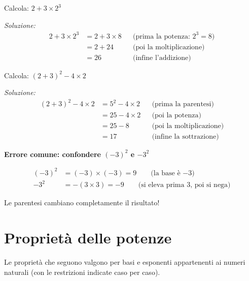 \begin{esempio}
  Calcola: $2 + 3 \times 2^3$

  \textit{Soluzione:}
  \begin{align*}
    2 + 3 \times 2^3
     & = 2 + 3 \times 8 &  & \text{(prima la potenza: } 2^3 = 8\text{)} \\
     & = 2 + 24         &  & \text{(poi la moltiplicazione)}            \\
     & = 26             &  & \text{(infine l'addizione)}
  \end{align*}
\end{esempio}

\begin{esempio}
  Calcola: $(2 + 3)^2 - 4 \times 2$

  \textit{Soluzione:}
  \begin{align*}
    (2 + 3)^2 - 4 \times 2
     & = 5^2 - 4 \times 2 &  & \text{(prima la parentesi)}     \\
     & = 25 - 4 \times 2  &  & \text{(poi la potenza)}         \\
     & = 25 - 8           &  & \text{(poi la moltiplicazione)} \\
     & = 17               &  & \text{(infine la sottrazione)}
  \end{align*}
\end{esempio}

\begin{attenzione}
  \textbf{Errore comune: confondere $(-3)^2$ e $-3^2$}

  \begin{align*}
    (-3)^2 & = (-3) \times (-3) = 9 \qquad \text{(la base è $-3$)}                \\
    -3^2   & = -(3 \times 3) = -9 \qquad \text{(si eleva prima $3$, poi si nega)}
  \end{align*}

  Le parentesi cambiano completamente il risultato!
\end{attenzione}

\section{Proprietà delle potenze}

Le proprietà che seguono valgono per basi e esponenti appartenenti
ai numeri naturali (con le restrizioni indicate caso per caso).

